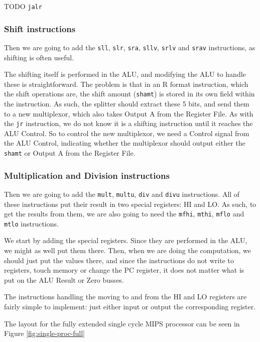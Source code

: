 TODO \texttt{jalr}

\subsubsection*{Shift instructions}
Then we are going to add the \texttt{sll}, \texttt{slr}, \texttt{sra},
\texttt{sllv}, \texttt{srlv} and \texttt{srav} instructions, as shifting is
often useful.

The shifting itself is performed in the ALU, and modifying the ALU to handle
these is straightforward. The problem is that in an R format instruction, which
the shift operations are, the shift amount (\texttt{shamt}) is stored in its
own field within the instruction. As such, the splitter should extract these 5
bits, and send them to a new multiplexor, which also takes Output A from the
Register File. As with the \texttt{jr} instruction, we do not know it is a
shifting instruction until it reaches the ALU Control. So to control the new
multiplexor, we need a Control signal from the ALU Control, indicating whether
the multiplexor should output either the \texttt{shamt} or Output A from the
Register File.

\subsubsection*{Multiplication and Division instructions}
Then we are going to add the \texttt{mult}, \texttt{multu}, \texttt{div} and
\texttt{divu} instructions. All of these instructions put their result in two
special registers: HI and LO. As such, to get the results from them, we are
also going to need the \texttt{mfhi}, \texttt{mthi}, \texttt{mflo} and
\texttt{mtlo} instructions.

We start by adding the special registers. Since they are performed in the ALU,
we might as well put them there. Then, when we are doing the computation, we
should just put the values there, and since the instructions do not write to
registers, touch memory or change the PC register, it does not matter what is
put on the ALU Result or Zero busses.

The instructions handling the moving to and from the HI and LO registers are
fairly simple to implement: just either input or output the corresponding
register.

The layout for the fully extended single cycle MIPS processor can be seen in
Figure \ref{fig:single-proc-full}

